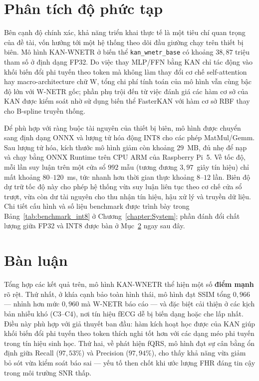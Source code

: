 \documentclass[../DoAn.tex]{subfiles}
\begin{document}
\section{Phân tích độ phức tạp}

Bên cạnh độ chính xác, khả năng triển khai thực tế là một tiêu chí quan trọng của đề tài, vốn hướng tới một hệ thống theo dõi đầu giường chạy trên thiết bị biên. Mô hình KAN-WNETR ở biến thể \texttt{kan\_wnetr\_base} có khoảng $38{,}87$ triệu tham số ở định dạng FP32. Do việc thay MLP/FFN bằng KAN chỉ tác động vào khối biến đổi phi tuyến theo token mà không làm thay đổi cơ chế self-attention hay macro-architecture chữ W, tổng chi phí tính toán của mô hình vẫn cùng bậc độ lớn với W-NETR gốc; phần phụ trội đến từ việc đánh giá các hàm cơ sở của KAN được kiểm soát nhờ sử dụng biến thể FasterKAN với hàm cơ sở RBF thay cho B-spline truyền thống.

Để phù hợp với ràng buộc tài nguyên của thiết bị biên, mô hình được chuyển sang định dạng ONNX và lượng tử hóa động INT8 cho các phép MatMul/Gemm. Sau lượng tử hóa, kích thước mô hình giảm còn khoảng $29$~MB, đủ nhẹ để nạp và chạy bằng ONNX Runtime trên CPU ARM của Raspberry Pi~5. Về tốc độ, mỗi lần suy luận trên một cửa sổ $992$ mẫu (tương đương $3{,}97$~giây tín hiệu) chỉ mất khoảng $80$--$120$~ms, tức nhanh hơn thời gian thực khoảng $8$--$12$ lần. Biên độ dự trữ tốc độ này cho phép hệ thống vừa suy luận liên tục theo cơ chế cửa sổ trượt, vừa còn dư tài nguyên cho thu nhận tín hiệu, hậu xử lý và truyền dữ liệu. Chi tiết cấu hình và số liệu benchmark được trình bày trong Bảng~\ref{tab:benchmark_int8} ở Chương~\ref{chapter:System}; phần đánh đổi chất lượng giữa FP32 và INT8 được bàn ở Mục~\ref{sec:discussion} ngay sau đây.

\section{Bàn luận}
\label{sec:discussion}

Tổng hợp các kết quả trên, mô hình KAN-WNETR thể hiện một số \textbf{điểm mạnh} rõ rệt. Thứ nhất, ở khía cạnh bảo toàn hình thái, mô hình đạt SSIM tổng $0{,}966$ --- nhỉnh hơn mức $0{,}960$ mà W-NETR báo cáo --- và đặc biệt cải thiện ở các kịch bản nhiễu khó (C3--C4), nơi tín hiệu fECG dễ bị biến dạng hoặc che lấp nhất. Điều này phù hợp với giả thuyết ban đầu: hàm kích hoạt học được của KAN giúp khối biến đổi phi tuyến theo token thích nghi tốt hơn với các dạng méo phi tuyến trong tín hiệu sinh học. Thứ hai, về phát hiện fQRS, mô hình đạt sự cân bằng ổn định giữa Recall ($97{,}53\%$) và Precision ($97{,}94\%$), cho thấy khả năng vừa giảm bỏ sót vừa kiểm soát báo sai --- yếu tố then chốt khi ước lượng FHR đáng tin cậy trong môi trường SNR thấp.
\end{document}
